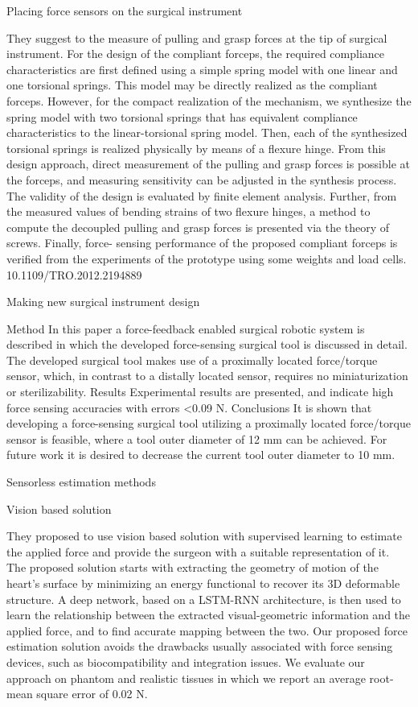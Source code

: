 Placing force sensors on the surgical instrument \cite{hong_design_2012}

They suggest to the measure of pulling and grasp forces at the tip of surgical 
instrument. For the design of the compliant forceps, the required compliance 
characteristics are first defined using a simple spring model with one linear 
and one torsional springs. This model may be directly realized as the compliant 
forceps. However, for the compact realization of the mechanism, we synthesize 
the spring model with two torsional springs that has equivalent compliance 
characteristics to the linear-torsional spring model. Then, each of the 
synthesized torsional springs is realized physically by means of a flexure 
hinge. From this design approach, direct measurement of the pulling and grasp 
forces is possible at the forceps, and measuring sensitivity can be adjusted 
in the synthesis process. The validity of the design is evaluated by finite 
element analysis. Further, from the measured values of bending strains of two 
flexure hinges, a method to compute the decoupled pulling and grasp forces is 
presented via the theory of screws. Finally, force- sensing performance of the 
proposed compliant forceps is verified from the experiments of the prototype 
using some weights and load cells. 10.1109/TRO.2012.2194889 

Making new surgical instrument design \cite{schwalb_forcesensing_2017}

Method In this paper a force-feedback enabled surgical robotic system is 
described in which the developed force-sensing surgical tool is discussed in 
detail. The developed surgical tool makes use of a proximally located 
force/torque sensor, which, in contrast to a distally located sensor, 
requires no miniaturization or sterilizability. Results Experimental results 
are presented, and indicate high force sensing accuracies with errors <0.09 N. 
Conclusions It is shown that developing a force-sensing surgical tool utilizing 
a proximally located force/torque sensor is feasible, where a tool outer diameter 
of 12 mm can be achieved. For future work it is desired to decrease the current 
tool outer diameter to 10 mm. 

Sensorless estimation methods

Vision based solution \cite{aviles_towards_2017}

They proposed to use vision based solution with supervised learning to estimate 
the applied force and provide the surgeon with a suitable representation of it.
 The proposed solution starts with extracting the geometry of motion of the 
 heart's surface by minimizing an energy functional to recover its 3D deformable 
 structure. A deep network, based on a LSTM-RNN architecture, is then used to 
 learn the relationship between the extracted visual-geometric information and 
 the applied force, and to find accurate mapping between the two. Our proposed 
 force estimation solution avoids the drawbacks usually associated with force 
 sensing devices, such as biocompatibility and integration issues. We evaluate 
 our approach on phantom and realistic tissues in which we report an average 
 root-mean square error of 0.02 N.

